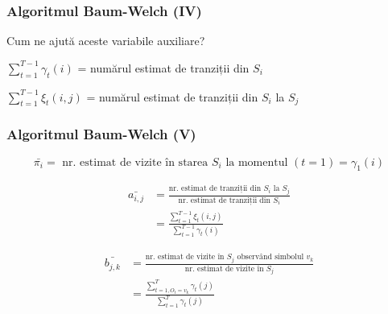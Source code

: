 \begin{frame}
	\frametitle{Algoritmul Baum-Welch (IV)}
	Cum ne ajută aceste variabile auxiliare?
	\vspace*{1em}
	
	\begin{block}{}
	$\displaystyle\sum_{t=1}^{T-1}\gamma_t(i)$ = numărul estimat de tranziții din $S_i$
	\end{block}
	\vspace*{1em}
	\begin{block}{}
	$\displaystyle\sum_{t=1}^{T-1}\xi_t(i,j)$ = numărul estimat de tranziții din $S_i$ la $S_j$
	\end{block}
	
\end{frame}

\begin{frame}[t]
	\frametitle{Algoritmul Baum-Welch (V)}
	\scriptsize {
	\begin{equation}
	\bar{\pi_i} = \mbox{ nr. estimat de vizite în starea } S_i \mbox{ la momentul } (t=1) = \gamma_1(i)
	\end{equation}
	\vspace*{-1em}
	\pause	
	
	\begin{equation}
	\begin{split}
	\bar{a_{i,j}} & = \frac{\mbox{nr. estimat de tranziții din } S_i \mbox{ la } S_j}
							{\mbox{nr. estimat de tranziții din } S_i} \\
				  & = \frac{\displaystyle\sum_{t=1}^{T-1}\xi_t(i,j)}
				   			{\displaystyle\sum_{t=1}^{T-1}\gamma_t(i)}	
	\end{split}
	\end{equation}
	\vspace*{-1em}
	\pause	
	
	\begin{equation}
	\begin{split}
	\bar{b_{j,k}}  & = \frac{\mbox{nr. estimat de vizite în } S_j \mbox{ observând simbolul } v_k}
							{\mbox{nr. estimat de vizite în } S_j} \\
				   & = \frac{\displaystyle\sum_{t=1, O_t = v_k}^{T}\gamma_t(j)}
				   			{\displaystyle\sum_{t=1}^{T}\gamma_t(j)}	
	\end{split}
	\end{equation}	
	}
	
\end{frame}

